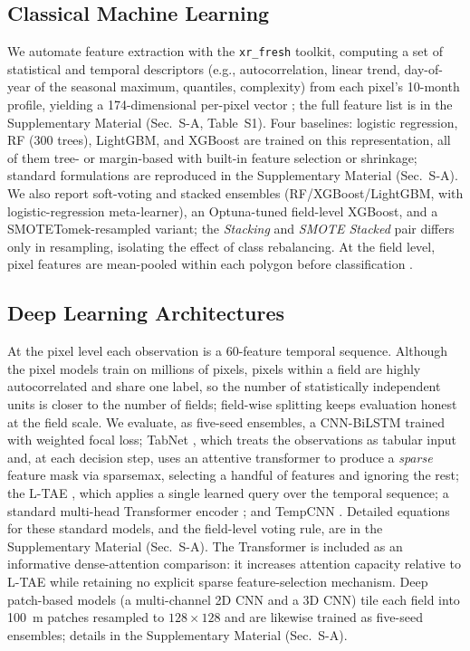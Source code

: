 \documentclass[preprint,authoryear]{elsarticle}
\begin{document}
\subsection{Classical Machine Learning}
We automate feature extraction with the \texttt{xr\_fresh} toolkit, computing a set of statistical and temporal descriptors (e.g., autocorrelation, linear trend, day-of-year of the seasonal maximum, quantiles, complexity) from each pixel's 10-month profile, yielding a 174-dimensional per-pixel vector \citep{mann2023, mann2025}; the full feature list is in the Supplementary Material (Sec.~S-A, Table~S1). Four baselines: logistic regression, RF (300 trees), LightGBM, and XGBoost \citep{breiman2001, ke2017, chen2016, friedman2001} are trained on this representation, all of them tree- or margin-based with built-in feature selection or shrinkage; standard formulations are reproduced in the Supplementary Material (Sec.~S-A). We also report soft-voting and stacked ensembles (RF/XGBoost/LightGBM, with logistic-regression meta-learner), an Optuna-tuned field-level XGBoost, and a SMOTETomek-resampled variant; the \emph{Stacking} and \emph{SMOTE Stacked} pair differs only in resampling, isolating the effect of class rebalancing. At the field level, pixel features are mean-pooled within each polygon before classification \citep{penabarragan2011}.

\subsection{Deep Learning Architectures}
At the pixel level each observation is a 60-feature temporal sequence. Although the pixel models train on millions of pixels, pixels within a field are highly autocorrelated and share one label, so the number of statistically independent units is closer to the number of fields; field-wise splitting keeps evaluation honest at the field scale. We evaluate, as five-seed ensembles, a CNN-BiLSTM trained with weighted focal loss; TabNet \citep{tabnet_orig, tabnet2024}, which treats the observations as tabular input and, at each decision step, uses an attentive transformer to produce a \emph{sparse} feature mask via sparsemax, selecting a handful of features and ignoring the rest; the L-TAE \citep{ltae2020}, which applies a single learned query over the temporal sequence; a standard multi-head Transformer encoder \citep{vaswani2017, russwurm2020}; and TempCNN \citep{tempcnn2019}. Detailed equations for these standard models, and the field-level voting rule, are in the Supplementary Material (Sec.~S-A). The Transformer is included as an informative dense-attention comparison: it increases attention capacity relative to L-TAE while retaining no explicit sparse feature-selection mechanism. Deep patch-based models (a multi-channel 2D CNN and a 3D CNN) tile each field into 100~m patches resampled to $128\times128$ and are likewise trained as five-seed ensembles; details in the Supplementary Material (Sec.~S-A).
\end{document}
